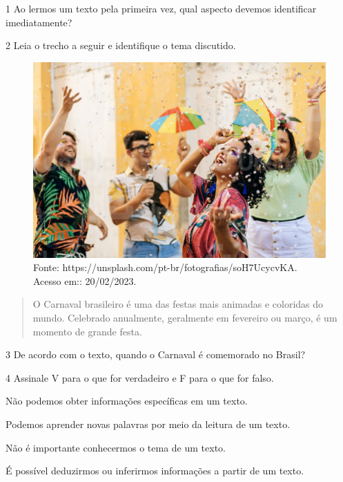 
\num{1}  Ao lermos um texto pela primeira vez, qual aspecto devemos identificar imediatamente?



\num{2} Leia o trecho a seguir e identifique o tema discutido.

\begin{figure}[htpb!]
\includegraphics[width=.5\textwidth]{./imgs/img2.jpg}
\caption{Fonte: https://unsplash.com/pt-br/fotografias/soH7UcycvKA. Acesso em:: 20/02/2023.}
\end{figure}

\begin{quote}
O Carnaval brasileiro é uma das festas mais animadas e coloridas do
mundo. Celebrado anualmente, geralmente em fevereiro ou março, é um
momento de grande festa.
\end{quote}



\num{3} De acordo com o texto, quando o Carnaval é comemorado no Brasil?



\num{4} Assinale V para o que for verdadeiro e F para o que for falso.

\begin{boxlist}
\item Não podemos obter informações específicas em um texto. 

\item Podemos aprender novas palavras por meio da leitura de um texto. 

\item Não é importante conhecermos o tema de um texto. 

\item É possível deduzirmos ou inferirmos informações a partir de um texto. 
\end{boxlist}

